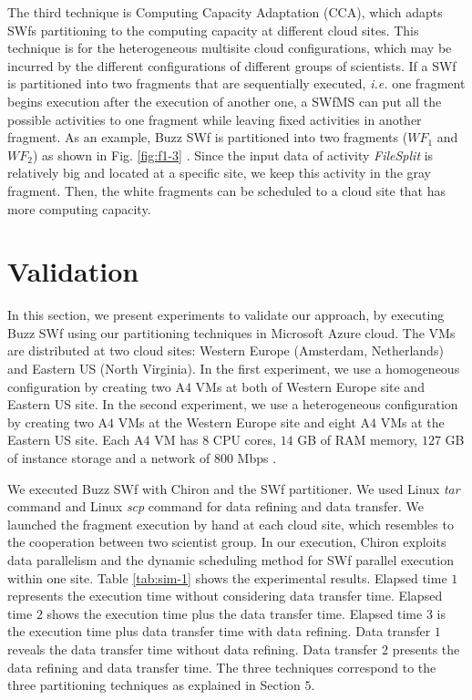 The third technique is Computing Capacity Adaptation (CCA), which adapts SWfs partitioning to the computing capacity at different cloud sites. 
This technique is for the heterogeneous multisite cloud configurations, which may be incurred by the different configurations of different groups of scientists.
If a SWf is partitioned into two fragments that are sequentially executed, 
\textit{i.e.} one fragment begins execution after the execution of another one,
a SWfMS can put all the possible activities to one fragment while leaving fixed activities in another fragment. 
As an example, Buzz SWf is partitioned into two fragments (\textit{$WF_{1}$} and \textit{$WF_{2}$}) as shown in Fig. \ref{fig:f1-3} . 
Since the input data of activity \textit{FileSplit} is relatively big and located at a specific site, we keep this activity in the gray fragment.
Then, the white fragments can be scheduled to a cloud site that has more computing capacity.



\section{Validation}
\label{sec:SWEMCVal}

In this section, we present experiments to validate our approach, by executing
Buzz SWf using our partitioning techniques in Microsoft Azure cloud. 
The VMs are distributed at two cloud sites: Western Europe (Amsterdam, Netherlands) and Eastern US (North Virginia). 
In the first experiment,
we use a homogeneous configuration by creating two A$4$ VMs at both of Western Europe site and Eastern US site.
In the second experiment,
we use a heterogeneous configuration by creating two A$4$ VMs at the Western Europe site and eight A$4$ VMs
at the Eastern US site. 
Each A$4$ VM has $8$ CPU cores, $14$ GB of RAM memory, $127$ GB of instance storage and a network of $800$ Mbps \cite{VMA,VMB}. 

We executed Buzz SWf with Chiron and the SWf partitioner.
We used Linux \textit{tar} command and Linux \textit{scp} command for data refining and data transfer.
We launched the fragment execution by hand at each cloud site, which resembles to the cooperation between two scientist group.
In our execution, Chiron exploits data parallelism and the dynamic scheduling method for SWf parallel execution within one site.
Table \ref{tab:sim-1} shows the experimental results. 
Elapsed time $1$ represents the execution time without considering data transfer time. 
Elapsed time $2$ shows the execution time plus the data transfer time. 
Elapsed time $3$ is the execution time plus data transfer time with data refining. 
Data transfer $1$ reveals the data transfer time without data refining. 
Data transfer $2$ presents the data refining and data transfer time. 
The three techniques correspond to the three partitioning techniques as explained in Section $5$.


